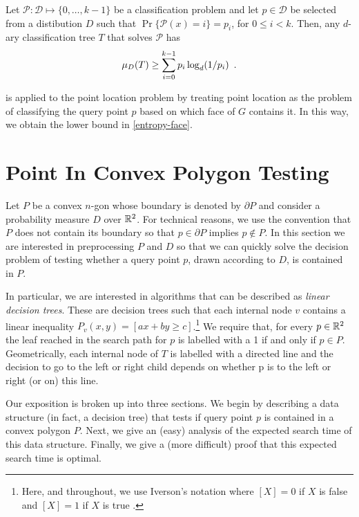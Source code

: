 \documentclass[charterfonts,lotsofwhite]{patmorin}
\newcommand{\boundary}{\partial}
\begin{document}
\setcounter{thm}{8}
\begin{thm}
Let $\mathcal{P}:\mathcal{D}\mapsto \{0,\ldots,k-1\}$ be a classification
problem and let $p\in \mathcal{D}$ be selected from a distibution $D$ such
that $\Pr\{\mathcal{P}(x)= i\}=p_i$, for $0\le i< k$.  Then, any
$d$-ary classification tree $T$ that solves $\mathcal{P}$ has
\begin{equation}
     \mu_D(T) \ge \sum_{i=0}^{k-1} p_i\log_d(1/p_i) \enspace .
	\eqlabel{shannon}
\end{equation}
\end{thm}
\setcounter{thm}{0}
 is applied to the point location problem by treating
point location as the problem of classifying the query point $p$ based
on which face of $G$ contains it.  In this way, we obtain the lower
bound in \eqref{entropy-face}.

\section{Point In Convex Polygon Testing}

Let $P$ be a convex $n$-gon whose boundary is denoted by $\partial P$
and consider a probability measure $D$ over $\mathbb{R}^2$.  For technical
reasons, we use the convention that $P$ does not contain its boundary
so that $p\in \boundary P$ implies $p\not\in P$.  In this section we
are interested in preprocessing $P$ and $D$ so that we can quickly
solve the decision problem of testing whether a query point $p$, drawn
according to $D$, is contained in $P$. 

In particular, we are interested in algorithms that can be described
as \emph{linear decision trees}.  These are decision trees such that
each internal node $v$ contains a linear inequality $P_v(x,y)=[ax+by
\ge c]$.\footnote{Here, and throughout, we use Iverson's notation
where $[X]=0$ if $X$ is false and $[X]=1$ if $X$ is true \cite{k92}.}
We require that, for every $p\in\mathbb{R}^2$ the leaf reached in the search
path for $p$ is labelled with a 1 if and only if $p\in P$.
Geometrically, each internal node of $T$ is labelled with a directed
line and the decision to go to the left or right child depends on
whether p is to the left or right (or on) this line.  

Our exposition is broken up into three sections.  We begin by
describing a data structure (in fact, a decision tree) that tests if
query point $p$ is contained in a convex polygon  $P$.  Next, we give
an (easy) analysis of the expected search time of this data structure.
Finally, we give a (more difficult) proof that this expected search
time is optimal.
\end{document}
